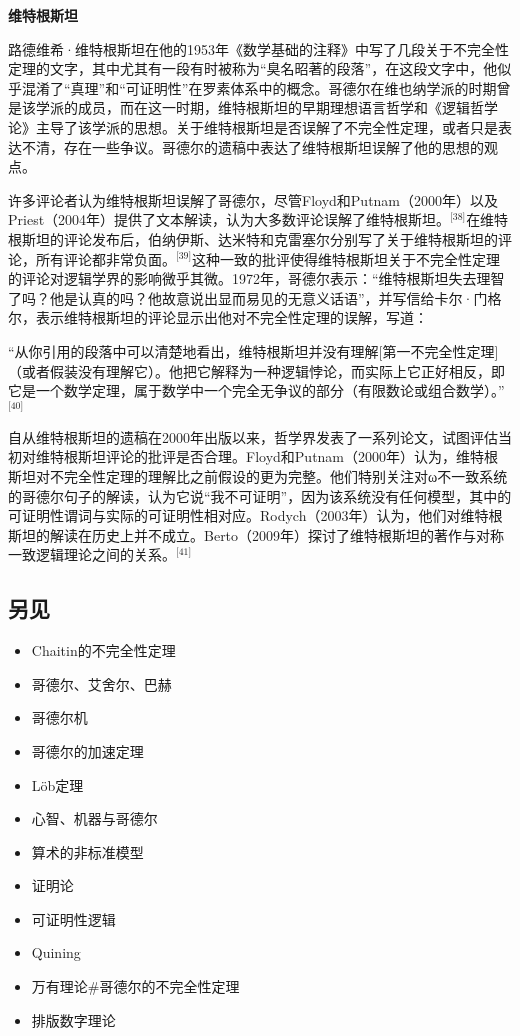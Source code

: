 \textbf{维特根斯坦} 

路德维希·维特根斯坦在他的1953年《数学基础的注释》中写了几段关于不完全性定理的文字，其中尤其有一段有时被称为“臭名昭著的段落”，在这段文字中，他似乎混淆了“真理”和“可证明性”在罗素体系中的概念。哥德尔在维也纳学派的时期曾是该学派的成员，而在这一时期，维特根斯坦的早期理想语言哲学和《逻辑哲学论》主导了该学派的思想。关于维特根斯坦是否误解了不完全性定理，或者只是表达不清，存在一些争议。哥德尔的遗稿中表达了维特根斯坦误解了他的思想的观点。

许多评论者认为维特根斯坦误解了哥德尔，尽管Floyd和Putnam（2000年）以及Priest（2004年）提供了文本解读，认为大多数评论误解了维特根斯坦。\(^\text{[38]}\)在维特根斯坦的评论发布后，伯纳伊斯、达米特和克雷塞尔分别写了关于维特根斯坦的评论，所有评论都非常负面。\(^\text{[39]}\)这种一致的批评使得维特根斯坦关于不完全性定理的评论对逻辑学界的影响微乎其微。1972年，哥德尔表示：“维特根斯坦失去理智了吗？他是认真的吗？他故意说出显而易见的无意义话语”，并写信给卡尔·门格尔，表示维特根斯坦的评论显示出他对不完全性定理的误解，写道：

“从你引用的段落中可以清楚地看出，维特根斯坦并没有理解[第一不完全性定理]（或者假装没有理解它）。他把它解释为一种逻辑悖论，而实际上它正好相反，即它是一个数学定理，属于数学中一个完全无争议的部分（有限数论或组合数学）。”\(^\text{[40]}\)

自从维特根斯坦的遗稿在2000年出版以来，哲学界发表了一系列论文，试图评估当初对维特根斯坦评论的批评是否合理。Floyd和Putnam（2000年）认为，维特根斯坦对不完全性定理的理解比之前假设的更为完整。他们特别关注对ω不一致系统的哥德尔句子的解读，认为它说“我不可证明”，因为该系统没有任何模型，其中的可证明性谓词与实际的可证明性相对应。Rodych（2003年）认为，他们对维特根斯坦的解读在历史上并不成立。Berto（2009年）探讨了维特根斯坦的著作与对称一致逻辑理论之间的关系。\(^\text{[41]}\)
\subsection{另见}
\begin{itemize}
\item Chaitin的不完全性定理 
\item 哥德尔、艾舍尔、巴赫  
\item 哥德尔机 
\item 哥德尔的加速定理 
\item Löb定理  
\item 心智、机器与哥德尔 
\item 算术的非标准模型 
\item 证明论  
\item 可证明性逻辑  
\item Quining  
\item 万有理论#哥德尔的不完全性定理 
\item 排版数字理论
\end{itemize}